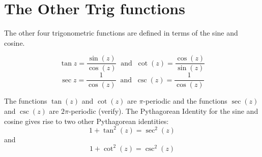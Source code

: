 \documentclass[handout]{ximera}
\begin{document}
\section{The Other Trig functions}
The other four trigonometric functions are defined in terms of the sine and cosine.

\begin{definition}
\[
\tan z = \frac{\sin(z)}{\cos(z)} \;\; \mbox{and} \;\; \cot(z) = \frac{\cos(z)}{\sin(z)}
\]
\[
\sec z = \frac{1}{\cos(z)} \;\; \mbox{and} \;\; \csc(z) = \frac{1}{\cos(z)}
\]
\end{definition}
The functions $\tan(z)$ and $\cot(z)$ are $\pi$-periodic
and the functions $\sec(z)$ and $\csc(z)$ are $2\pi$-periodic (verify).
The Pythagorean Identity for the sine and cosine gives rise to two other Pythagorean identities:
\[
1+ \tan^2(z) = \sec^2(z)
\]
and
\[
1 + \cot^2(z) = \csc^2(z)
\]
\end{document}
